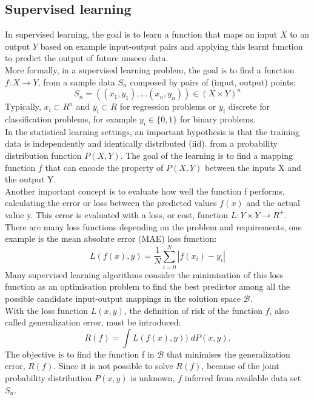 \subsection{Supervised learning}
In supervised learning, the goal is to learn a function that maps an input $X$ to an output $Y$ based on example input-output pairs and applying this learnt function to predict the output of future unseen data. \\

More formally, in a supervised learning problem, the goal is to find a function $f : X \rightarrow Y$, from a sample data $S_n$ composed by pairs of (input, output) points:
\[
S_n = ((x_1,y_1),\dots(x_n,y_n)) \in (X \times Y)^n
\]
Typically, $x_i \subset R^n$ and $y_i \subset R$ for regression problems or $y_i$ discrete for classification problems, for example $y_i \in \{0,1\}$ for binary problems. \\

In the statistical learning settings, an important hypothesis is that the training data is independently and identically distributed (\gls{iid}). from a probability distribution function $P(X,Y)$. The goal of the learning is to find a mapping function $f$ that can encode the property of $P(X,Y)$ between the inputs X and the output Y. \\

Another important concept is to evaluate how well the function f performs, calculating the error or loss between the predicted values $f(x)$ and the actual value y. This error is evaluated with a loss, or cost, function $L: Y \times Y \rightarrow R^+$. There are many loss functions depending on the problem and requirements, one example is the mean absolute error (\gls{MAE}) loss function:
\[
L(f(x),y)= \frac{1}{N} \sum_{i=0}^{N} |f(x_i)-y_i| 
\]
Many supervised learning algorithms consider the minimisation
of this loss function as an optimisation problem to find the best predictor among all the possible candidate input-output mappings in the solution space $\mathcal{B}$. \\

With the loss function $L(x,y)$, the definition of risk of the function $f$, also called generalization error, must be introduced:
\[
R(f) = \int L(f(x),y)) \; dP(x,y). 
\]
The objective is to find the function f in $\mathcal{B}$ that minimises the generalization error, $R(f)$. Since it is not possible to solve $R(f)$, because of the joint probability distribution $P(x,y)$ is unknown, $f$ inferred from available data set $S_n$.

